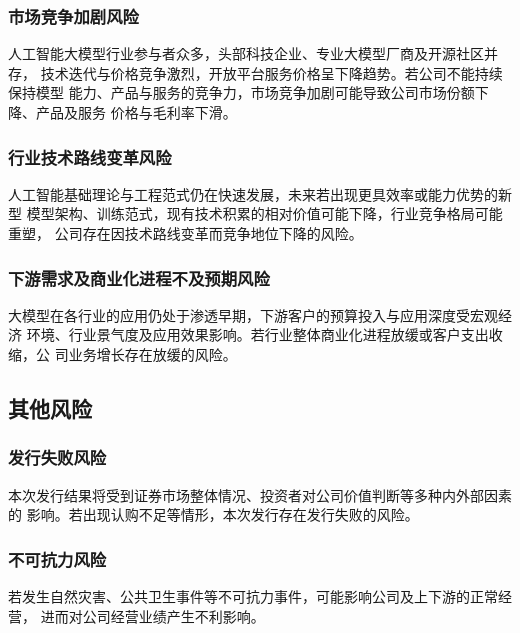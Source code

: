 \subsubsection{市场竞争加剧风险}

人工智能大模型行业参与者众多，头部科技企业、专业大模型厂商及开源社区并存，
技术迭代与价格竞争激烈，开放平台服务价格呈下降趋势。若公司不能持续保持模型
能力、产品与服务的竞争力，市场竞争加剧可能导致公司市场份额下降、产品及服务
价格与毛利率下滑。

\subsubsection{行业技术路线变革风险}

人工智能基础理论与工程范式仍在快速发展，未来若出现更具效率或能力优势的新型
模型架构、训练范式，现有技术积累的相对价值可能下降，行业竞争格局可能重塑，
公司存在因技术路线变革而竞争地位下降的风险。

\subsubsection{下游需求及商业化进程不及预期风险}

大模型在各行业的应用仍处于渗透早期，下游客户的预算投入与应用深度受宏观经济
环境、行业景气度及应用效果影响。若行业整体商业化进程放缓或客户支出收缩，公
司业务增长存在放缓的风险。

\subsection{其他风险}

\subsubsection{发行失败风险}

本次发行结果将受到证券市场整体情况、投资者对公司价值判断等多种内外部因素的
影响。若出现认购不足等情形，本次发行存在发行失败的风险。

\subsubsection{不可抗力风险}

若发生自然灾害、公共卫生事件等不可抗力事件，可能影响公司及上下游的正常经营，
进而对公司经营业绩产生不利影响。
